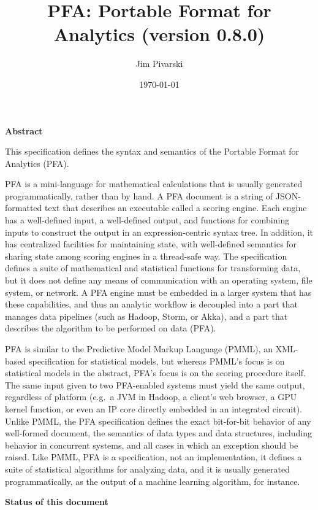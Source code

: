\documentclass{article}
\title{PFA: Portable Format for Analytics (version 0.8.0)}
\author{Jim Pivarski}
\date{\today}
\theoremstyle{definition}
\begin{document}
\maketitle

{\large \bf Abstract}
\vspace{0.25 cm}

This specification defines the syntax and semantics of the Portable Format for Analytics (PFA).

PFA is a mini-language for mathematical calculations that is usually generated programmatically, rather than by hand.  A PFA document is a string of JSON-formatted text that describes an executable called a scoring engine.  Each engine has a well-defined input, a well-defined output, and functions for combining inputs to construct the output in an expression-centric syntax tree.  In addition, it has centralized facilities for maintaining state, with well-defined semantics for sharing state among scoring engines in a thread-safe way.  The specification defines a suite of mathematical and statistical functions for transforming data, but it does not define any means of communication with an operating system, file system, or network.  A PFA engine must be embedded in a larger system that has these capabilities, and thus an analytic workflow is decoupled into a part that manages data pipelines (such as Hadoop, Storm, or Akka), and a part that describes the algorithm to be performed on data (PFA).  

PFA is similar to the Predictive Model Markup Language (PMML), an XML-based specification for statistical models, but whereas PMML's focus is on statistical models in the abstract, PFA's focus is on the scoring procedure itself.  The same input given to two PFA-enabled systems must yield the same output, regardless of platform (e.g.\ a JVM in Hadoop, a client's web browser, a GPU kernel function, or even an IP core directly embedded in an integrated circuit).  Unlike PMML, the PFA specification defines the exact bit-for-bit behavior of any well-formed document, the semantics of data types and data structures, including behavior in concurrent systems, and all cases in which an exception should be raised.  Like PMML, PFA is a specification, not an implementation, it defines a suite of statistical algorithms for analyzing data, and it is usually generated programmatically, as the output of a machine learning algorithm, for instance.

\vspace{0.5 cm}
{\large \bf Status of this document}
\vspace{0.25 cm}
\end{document}
